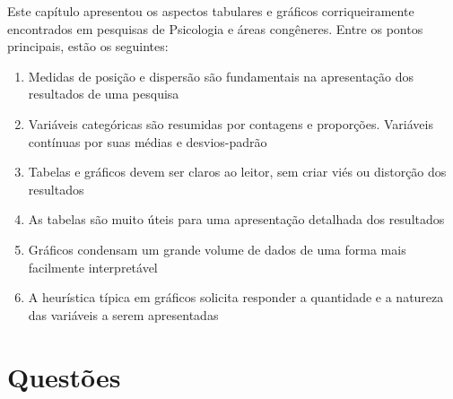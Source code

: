 \documentclass[
]{book}
\providecommand{\tightlist}{%
  \setlength{\itemsep}{0pt}\setlength{\parskip}{0pt}}
\begin{document}
Este capítulo apresentou os aspectos tabulares e gráficos corriqueiramente encontrados em pesquisas de Psicologia e áreas congêneres. Entre os pontos principais, estão os seguintes:

\begin{enumerate}
\def\labelenumi{\arabic{enumi}.}
\tightlist
\item
  Medidas de posição e dispersão são fundamentais na apresentação dos resultados de uma pesquisa\\
\item
  Variáveis categóricas são resumidas por contagens e proporções. Variáveis contínuas por suas médias e desvios-padrão\\
\item
  Tabelas e gráficos devem ser claros ao leitor, sem criar viés ou distorção dos resultados\\
\item
  As tabelas são muito úteis para uma apresentação detalhada dos resultados\\
\item
  Gráficos condensam um grande volume de dados de uma forma mais facilmente interpretável\\
\item
  A heurística típica em gráficos solicita responder a quantidade e a natureza das variáveis a serem apresentadas\\
\end{enumerate}

\hypertarget{questuxf5es-1}{%
\section{Questões}\label{questuxf5es-1}}
\end{document}
